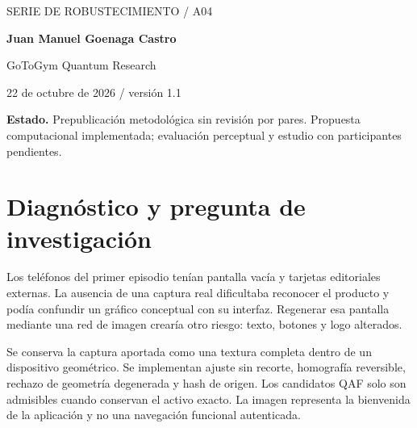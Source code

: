 \documentclass[10pt,a4paper]{article}
\begin{document}
\begin{center}{\sffamily\small\textcolor{mint}{SERIE DE ROBUSTECIMIENTO / A04}}\par\vspace{10pt}{\sffamily\LARGE\bfseries\textcolor{ink}{Fidelidad de producto en un teléfono proyectivo}}\par\vspace{7pt}{\large Geometría verificable de la pantalla original de GoToGym}\par\vspace{12pt}\textbf{Juan Manuel Goenaga Castro}\par GoToGym Quantum Research\par 22 de octubre de 2026 / versión 1.1\end{center}\colorbox{ink!6}{\parbox{.96\linewidth}{\small\textbf{Estado.} Prepublicación metodológica sin revisión por pares. Propuesta computacional implementada; evaluación perceptual y estudio con participantes pendientes.}}\begin{abstract}Se conserva la captura aportada como una textura completa dentro de un dispositivo geométrico. Se implementan ajuste sin recorte, homografía reversible, rechazo de geometría degenerada y hash de origen. Los candidatos QAF solo son admisibles cuando conservan el activo exacto. La imagen representa la bienvenida de la aplicación y no una navegación funcional autenticada. Se presenta el problema observado, una formalización con unidades y restricciones, el código correspondiente y sus controles. Se distingue la verificación de ingeniería de calidad percibida, identidad regional y efecto comercial. El uso QAF corresponde a la región clásica identificable y conserva un comparador con los mismos recursos.\end{abstract}
\section{Diagnóstico y pregunta de investigación}
Los teléfonos del primer episodio tenían pantalla vacía y tarjetas editoriales externas. La ausencia de una captura real dificultaba reconocer el producto y podía confundir un gráfico conceptual con su interfaz. Regenerar esa pantalla mediante una red de imagen crearía otro riesgo: texto, botones y logo alterados.

Se conserva la captura aportada como una textura completa dentro de un dispositivo geométrico. Se implementan ajuste sin recorte, homografía reversible, rechazo de geometría degenerada y hash de origen. Los candidatos QAF solo son admisibles cuando conservan el activo exacto. La imagen representa la bienvenida de la aplicación y no una navegación funcional autenticada.
\end{document}
